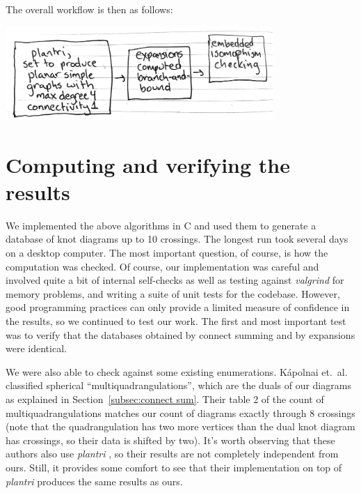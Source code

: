 \documentclass[amsmath,secnumarabic,floatfix,amssymb,nofootinbib,nobibnotes,letterpaper,11pt,tightenlines,showkeys]{revtex4}
\theoremstyle{definition}
\newcommand{\plantri}{\textit{plantri} }
\newcommand{\valgrind}{\textit{valgrind} }
\begin{document}
The overall workflow is then as follows:
\begin{center}
\includegraphics[width=4in]{workflow}
\end{center}

\section{Computing and verifying the results}

We implemented the above algorithms in C and used them to generate a database of knot diagrams up to 10 crossings. The longest run took several days on a desktop computer. The most important question, of course, is how the computation was checked. Of course, our implementation was careful and involved quite a bit of internal self-checks as well as testing against \valgrind for memory problems, and writing a suite of unit tests for the codebase. However, good programming practices can only provide a limited measure of confidence in the results, so we continued to test our work. The first and most important test was to verify that the databases obtained by connect summing and by expansions were identical. 

We were also able to check against some existing enumerations. K\'apolnai et.\ al. classified spherical ``multiquadrangulations''\cite{Kapolnai:2012hs}, which are the duals of our diagrams as explained in Section~\ref{subsec:connect sum}. Their table 2 of the count of multiquadrangulations matches our count of diagrams exactly through $8$ crossings (note that the quadrangulation has two more vertices than the dual knot diagram has crossings, so their data is shifted by two). It's worth observing that these authors also use \plantri, so their results are not completely independent from ours. Still, it provides some comfort to see that their implementation on top of \plantri produces the same results as ours.
\end{document}
